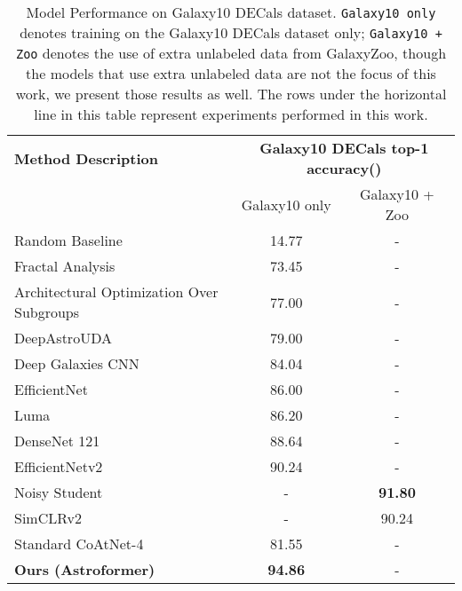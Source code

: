 \documentclass{article} \usepackage{iclr2023_conference,times}
\begin{document}
\begin{table}[ht]
    \caption{Model Performance on Galaxy10 DECals dataset. \texttt{Galaxy10 only} denotes training on the Galaxy10 DECals dataset only; \texttt{Galaxy10 + Zoo} denotes the use of extra unlabeled data from GalaxyZoo, though the models that use extra unlabeled data are not the focus of this work, we present those results as well. The rows under the horizontal line in this table represent experiments performed in this work.}
    \centering
    \begin{adjustbox}{width=\textwidth,center}
    \begin{tabular}{lcc}
    \toprule
    \textbf{Method Description} & \multicolumn{2}{c}{\textbf{Galaxy10 DECals top-1 accuracy()}}\\
    & Galaxy10 only & Galaxy10 + Zoo\\
    \midrule
    Random Baseline & 14.77 & -\\
    Fractal Analysis \citep{9990776} & 73.45 & -\\
    Architectural Optimization Over Subgroups \citep{https://doi.org/10.48550/arxiv.2210.05484} & 77.00 & -\\
    DeepAstroUDA \citep{https://doi.org/10.48550/arxiv.2211.00677} & 79.00 & -\\
    Deep Galaxies CNN \citep{10.1007/978-3-031-23092-9_1} & 84.04 & -\\
    EfficientNet \citep{tan2019efficientnet} & 86.00 & - \\
    Luma \citep{holandainfluence} & 86.20 & -\\
    DenseNet 121 \citep{iandola2014densenet} & 88.64 & - \\
    EfficientNetv2 \citep{tan2021efficientnetv2} & 90.24 & -\\
    \midrule
    Noisy Student \citep{xie2020self} & - & \textbf{91.80}\\
    SimCLRv2 \citep{NEURIPS2020_fcbc95cc} & - & 90.24\\
    Standard CoAtNet-4 \citep{dai2021coatnet} & 81.55 & -\\
    \textbf{Ours (Astroformer)} & \textbf{94.86} & -\\
    \bottomrule
    \end{tabular}
    \end{adjustbox}
    \label{tab:results}
\end{table}
\end{document}
